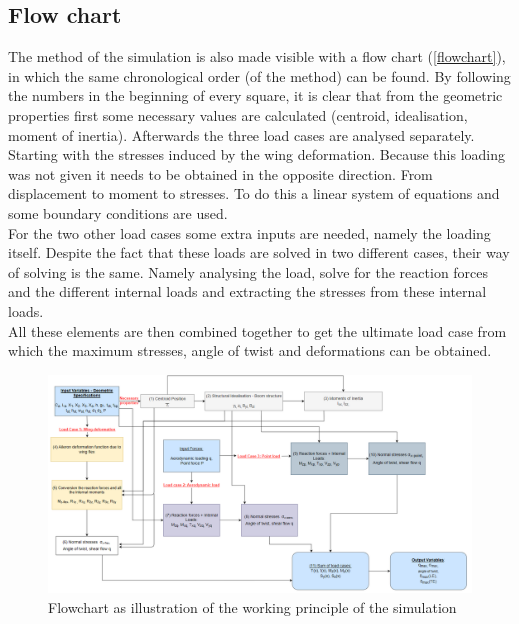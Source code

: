 \subsection{Flow chart}
The method of the simulation is also made visible with a flow chart (\autoref{flowchart}), in which the same chronological order (of the method) can be found. By following the numbers in the beginning of every square, it is clear that from the geometric properties first some necessary values are calculated (centroid, idealisation, moment of inertia). Afterwards the three load cases are analysed separately. Starting with the stresses induced by the wing deformation. Because this loading was not given it needs to be obtained in the opposite direction. From displacement to moment to stresses. To do this a linear system of equations and some boundary conditions are used.\\

\noindent For the two other load cases some extra inputs are needed, namely the loading itself. Despite the fact that these loads are solved in two different cases, their way of solving is the same. Namely analysing the load, solve for the reaction forces and the different internal loads and extracting the stresses from these internal loads.\\

\noindent All these elements are then combined together to get the ultimate load case from which the maximum stresses, angle of twist and deformations can be obtained.


\label{subsec:Flow_chart}
\begin{figure}[H]
    \centering
    \includegraphics[width=23cm, angle=90]{Images/Flowchart3.PNG}
    \caption{Flowchart as illustration of the working principle of the simulation }
    \label{flowchart}
\end{figure}



















